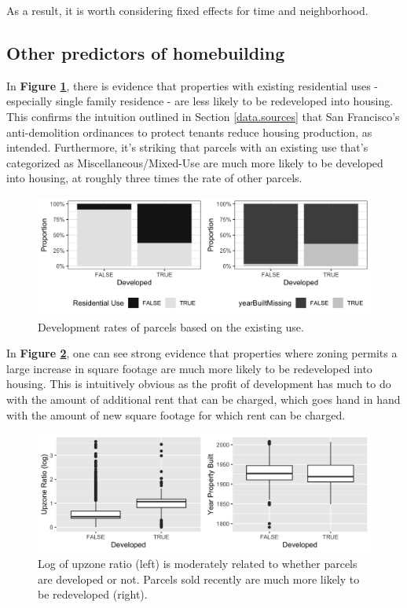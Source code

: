 \documentclass[a4paper,12pt]{article}
\begin{document}
As a result, it is worth considering fixed effects for time and neighborhood.

\subsection{Other predictors of homebuilding}
In \textbf{Figure \ref{fig:eda_barplots}}, there is evidence that properties with existing residential uses - especially single family residence - are less likely to be redeveloped into housing. This confirms the intuition outlined in Section \ref{data.sources} that San Francisco's anti-demolition ordinances to protect tenants reduce housing production, as intended. Furthermore, it's striking that parcels with an existing use that's categorized as Miscellaneous/Mixed-Use are much more likely to be developed into housing, at roughly three times the rate of other parcels.

\begin{figure}[hbt]
    \centering
    \includegraphics[scale=.1]{pdev/figures/eda_barplots.png}
    \caption{Development rates of parcels based on the existing use.}
    \label{fig:eda_barplots}
\end{figure}


In \textbf{Figure \ref{fig:eda_boxplots}}, one can see strong evidence that properties where zoning permits a large increase in square footage are much more likely to be redeveloped into housing. This is intuitively obvious as the profit of development has much to do with the amount of additional rent that can be charged, which goes hand in hand with the amount of new square footage for which rent can be charged.

\begin{figure}[hbt]
    \centering
    \includegraphics[scale=.8]{pdev/figures/eda_boxplots.png}
    \caption{Log of upzone ratio (left) is moderately related to whether parcels are developed or not. Parcels sold recently are much more likely to be redeveloped (right).}
    \label{fig:eda_boxplots}
\end{figure}
\end{document}
